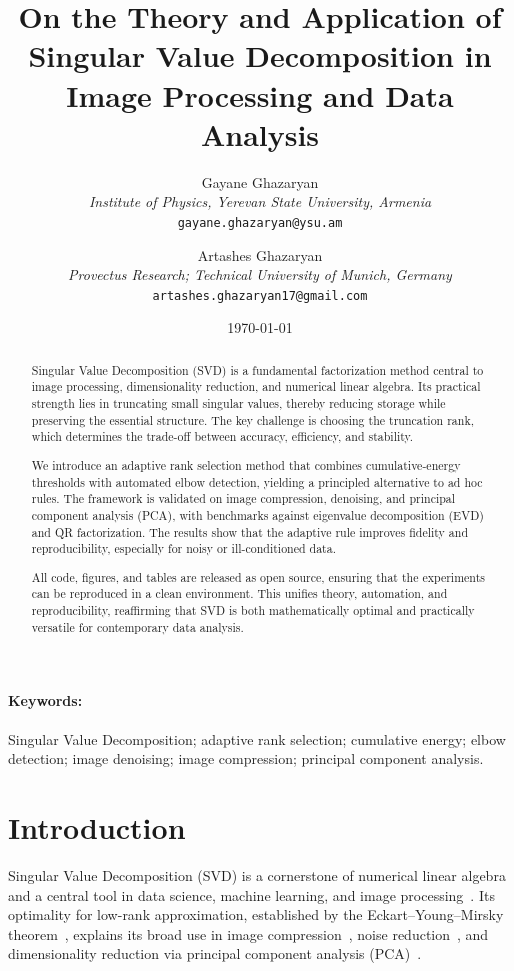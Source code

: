 \documentclass[11pt,a4paper]{article}
\title{On the Theory and Application of Singular Value Decomposition in Image Processing and Data Analysis}
\author{
  Gayane Ghazaryan\\
  \textit{Institute of Physics, Yerevan State University, Armenia}\\
  \texttt{gayane.ghazaryan@ysu.am}
  \and
  Artashes Ghazaryan\\
  \textit{Provectus Research; Technical University of Munich, Germany}\\
  \texttt{artashes.ghazaryan17@gmail.com}
}
\date{\today}
\begin{document}
\maketitle
\begin{abstract}
Singular Value Decomposition (SVD) is a fundamental factorization method central to image processing, dimensionality reduction, and numerical linear algebra. Its practical strength lies in truncating small singular values, thereby reducing storage while preserving the essential structure. The key challenge is choosing the truncation rank, which determines the trade-off between accuracy, efficiency, and stability.

We introduce an adaptive rank selection method that combines cumulative-energy thresholds with automated elbow detection, yielding a principled alternative to ad hoc rules. The framework is validated on image compression, denoising, and principal component analysis (PCA), with benchmarks against eigenvalue decomposition (EVD) and QR factorization. The results show that the adaptive rule improves fidelity and reproducibility, especially for noisy or ill-conditioned data.

All code, figures, and tables are released as open source, ensuring that the experiments can be reproduced in a clean environment. This unifies theory, automation, and reproducibility, reaffirming that SVD is both mathematically optimal and practically versatile for contemporary data analysis.
\end{abstract}

\paragraph{Keywords:}
Singular Value Decomposition; adaptive rank selection; cumulative energy; elbow detection; image denoising; image compression; principal component analysis.


\section{Introduction}
\label{sec:intro}

Singular Value Decomposition (SVD) is a cornerstone of numerical linear algebra and a central tool in data science, machine learning, and image processing~\cite{golub2013matrix,hansen1987truncated,wall2003svd}. Its optimality for low-rank approximation, established by the Eckart--Young--Mirsky theorem~\cite{eckart1936approximation,golub2013matrix}, explains its broad use in image compression~\cite{andrews1976svd,swathi2017svd}, noise reduction~\cite{hansen2010discrete,guo2016svddenoise,gu2014wnnm,candes2011robust}, and dimensionality reduction via principal component analysis (PCA)~\cite{jolliffe2016pca,halko2011finding,lin2016lowrankreview}.  
\end{document}

